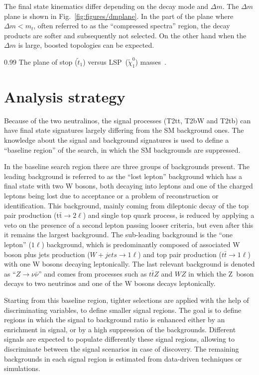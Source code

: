 The final state kinematics differ depending on the decay mode and $\Delta m$. The $\Delta m$ plane is shown in Fig.~\ref{fig:figures/dmplane}. In the part of the plane where $\Delta m < m_t$, often referred to as the ``compressed spectra'' region, the decay products are softer and subsequently not selected. On the other hand when the $\Delta m$ is large, boosted topologies can be expected. 


                 {0.99}       %
                 { The plane of stop ($\tilde{t}_{1}$) versus LSP~($\tilde{\chi}^{0}_{1}$) masses~\cite{Aad:2014kra}. }


\section{Analysis strategy~\label{sec:strategy}}

Because of the two neutralinos, the signal processes (T2tt, T2bW and T2tb)  can have final state signatures largely differing from the SM background ones. The knowledge about the signal and background signatures is used to define a ``baseline region'' of the search, in which the SM backgrounds are suppressed. 

In the baseline search region there are three groups of backgrounds present. The leading background is referred to as the ``lost lepton'' background which has a final state with two W bosons, both decaying into leptons and one of the charged leptons being lost due to acceptance or a problem of reconstruction or identification. This background, mainly coming from dileptonic decay of the top pair production ($\mathrm{t\bar{t}} \to 2 \ell$) and single top quark process,  is reduced by applying a veto on the presence of a second lepton passing looser criteria, but even after this it remains the largest background. The sub-leading background is the ``one lepton'' ($1\ell$) background, which is predominantly composed of associated W boson plus jets production  ($W+jets \to 1\ell$) and top pair production ($t\bar{t} \to 1 \ell$) with one W bosons decaying leptonically. The last relevant background is denoted as ``$Z \to \nu \bar{\nu}$'' and comes from processes such as $t\bar{t}Z$ and $WZ$ in which the Z~boson decays to two neutrinos and one of the W bosons decays leptonically.  

Starting from this baseline region, tighter selections are applied  with the help of discriminating variables, to define smaller signal regions. The goal is to define regions in which the signal to background ratio is enhanced either by an enrichment in signal, or by a high suppression of the backgrounds. Different signals are expected to populate differently these signal regions, allowing to discriminate between the signal scenarios in case of discovery. The remaining backgrounds in each signal region is estimated from data-driven techniques or simulations. 

